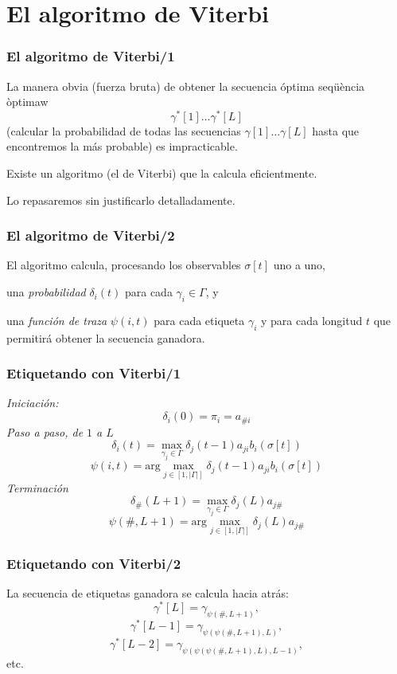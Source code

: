 \documentclass{beamer}
\begin{document}
\section{El algoritmo de Viterbi}
\begin{frame}
\frametitle{ El algoritmo de Viterbi/1}

{
{
La manera obvia (fuerza bruta) de obtener la secuencia óptima seqüència òptimaw
  \[\gamma^*[1]\ldots\gamma^*[L]\] (calcular la probabilidad de  todas
  las secuencias \(\gamma[1]\ldots\gamma[L]\) hasta que encontremos la más probable) es impracticable.}

{Existe un algoritmo (el de Viterbi) que la calcula
  eficientmente.} 

{Lo repasaremos sin justificarlo detalladamente.}

}
\end{frame}
\begin{frame}
\frametitle{El algoritmo de Viterbi/2}

{
{El algoritmo calcula, procesando los observables \(\sigma[t]\)
  uno a uno,}
\begin{itemize}
{\item una \emph{probabilidad} \(\delta_i(t)\) para cada
  \(\gamma_i\in\Gamma\), y }
{\item una \emph{función de traza} \(\psi(i,t)\) para  cada
  etiqueta \(\gamma_i\) y para cada longitud \(t\) que
  permitirá obtener la secuencia ganadora.}
\end{itemize}
}
\end{frame}
\begin{frame}
\frametitle{ Etiquetando con Viterbi/1
}
{
{\emph{Iniciación:}
\[\delta_i(0)=\pi_i=a_{\#i}\]
}
{\emph{Paso a paso, de \(1\) a \(L\)}
\[\delta_i(t)= \max_{\gamma_j\in\Gamma} \delta_j(t-1) a_{ji} b_i(\sigma[t]) \]
\[\psi(i,t)= \mathrm{arg} \max_{j\in[1,|\Gamma|]} \delta_j(t-1) a_{ji} b_i(\sigma[t]) \]
}
{\emph{Terminación}
\[\delta_\#(L+1)= \max_{\gamma_j\in\Gamma} \delta_j(L) a_{j\#} \]
\[\psi(\#,L+1)= \mathrm{arg} \max_{j\in[1,|\Gamma|]} \delta_j(L) a_{j\#} \]
}

}
\end{frame}
\begin{frame}
\frametitle{ Etiquetando con Viterbi/2}

{
{La secuencia de etiquetas ganadora se calcula hacia atrás:
\[\gamma^*[L]=\gamma_{\psi(\#,L+1)},\]
\[\gamma^*[L-1]=\gamma_{\psi(\psi(\#,L+1),L)},\]
\[\gamma^*[L-2]=\gamma_{\psi(\psi(\psi(\#,L+1),L),L-1)},\]
etc.
}

}
\end{frame}
\end{document}

